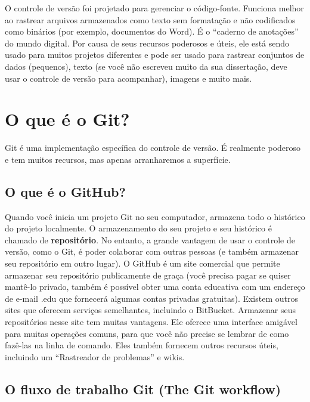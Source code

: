 \documentclass[]{book}
\begin{document}
O controle de versão foi projetado para gerenciar o código-fonte. Funciona melhor ao rastrear arquivos armazenados como texto sem formatação e não codificados como binários (por exemplo, documentos do Word). É o ``caderno de anotações'' do mundo digital. Por causa de seus recursos poderosos e úteis, ele está sendo usado para muitos projetos diferentes e pode ser usado para rastrear conjuntos de dados (pequenos), texto (se você não escreveu muito da sua dissertação, deve usar o controle de versão para acompanhar), imagens e muito mais.

\hypertarget{o-que-e-o-git}{%
\chapter{O que é o Git?}\label{o-que-e-o-git}}

Git é uma implementação específica do controle de versão. É realmente poderoso e tem muitos recursos, mas apenas arranharemos a superfície.

\hypertarget{o-que-e-o-github}{%
\section{O que é o GitHub?}\label{o-que-e-o-github}}

Quando você inicia um projeto Git no seu computador, armazena todo o histórico do projeto localmente. O armazenamento do seu projeto e seu histórico é chamado de \textbf{repositório}. No entanto, a grande vantagem de usar o controle de versão, como o Git, é poder colaborar com outras pessoas (e também armazenar seu repositório em outro lugar).
O GitHub é um site comercial que permite armazenar seu repositório publicamente de graça (você precisa pagar se quiser mantê-lo privado, também é possível obter uma conta educativa com um endereço de e-mail .edu que fornecerá algumas contas privadas gratuitas). Existem outros sites que oferecem serviços semelhantes, incluindo o BitBucket. Armazenar seus repositórios nesse site tem muitas vantagens. Ele oferece uma interface amigável para muitas operações comuns, para que você não precise se lembrar de como fazê-las na linha de comando. Eles também fornecem outros recursos úteis, incluindo um ``Rastreador de problemas'' e wikis.

\hypertarget{o-fluxo-de-trabalho-git-the-git-workflow}{%
\section{O fluxo de trabalho Git (The Git workflow)}\label{o-fluxo-de-trabalho-git-the-git-workflow}}
\end{document}
